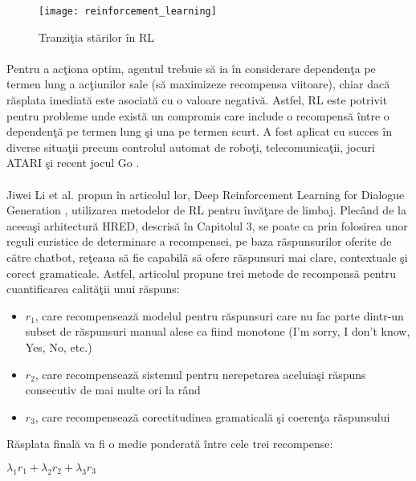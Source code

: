 \begin{figure}[H]
\centering
\texttt{[image: reinforcement\_learning]}
\caption{Tranzi\c tia st\u arilor \^ in RL}
\end{figure}

\paragraph{}
Pentru a ac\c tiona optim, agentul trebuie s\u a ia \^ in considerare dependen\c ta pe termen lung a ac\c tiunilor sale (s\u a maximizeze recompensa viitoare), chiar dac\u a r\u asplata imediat\u a este asociat\u a cu o valoare negativ\u a. Astfel, RL este potrivit pentru probleme unde exist\u a un compromis care include o recompens\u a \^ intre o dependen\c t\u a pe termen lung \c si una pe termen scurt. A fost aplicat cu succes \^ in diverse situa\c tii precum controlul automat de robo\c ti, telecomunica\c tii, jocuri ATARI \c si recent jocul Go \cite{silver2016mastering}.

\paragraph{}
Jiwei Li et al. propun \^ in articolul lor, Deep Reinforcement Learning for Dialogue Generation \cite{DBLP:journals/corr/LiMRGGJ16}, utilizarea metodelor de RL pentru \^ inv\u a\c tare de limbaj. Plec\^ and de la aceea\c si arhitectur\u a HRED, descris\u a \^ in Capitolul 3, se poate ca prin folosirea unor reguli euristice de determinare a recompensei, pe baza r\u aspunsurilor oferite de c\u atre chatbot, re\c teaua s\u a fie capabil\u a s\u a ofere r\u aspunsuri mai clare, contextuale \c si corect gramaticale. Astfel, articolul propune trei metode de recompens\u a pentru cuantificarea calit\u a\c tii unui r\u aspuns:

\begin{itemize}
	\item \(r_1\), care recompenseaz\u a modelul pentru r\u aspunsuri care nu fac parte dintr-un subset de r\u aspunsuri manual alese ca fiind monotone (I'm sorry, I don't know, Yes, No, etc.)
	\item \(r_2\), care recompenseaz\u a sistemul pentru nerepetarea aceluia\c si r\u aspuns consecutiv de mai multe ori la r\^ and
	\item \(r_3\), care recompenseaz\u a corectitudinea gramatical\u a \c si coeren\c ta r\u aspunsului
\end{itemize}


R\u asplata final\u a va fi o medie ponderat\u a \^ intre cele trei recompense:
\begin{center}
\(\lambda_1 r_1 + \lambda_2 r_2 + \lambda_3 r_3\)
\end{center}

